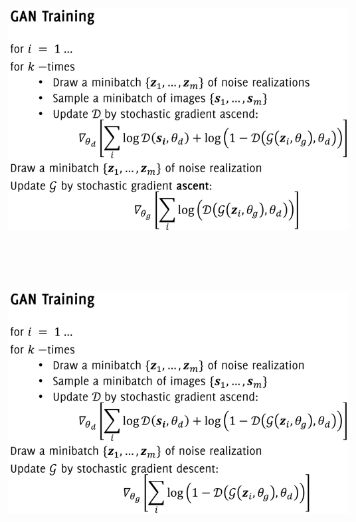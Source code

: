 \begin{minipage}{\linewidth}
\centering
\hspace*{-2cm}    
\begin{minipage}{9cm}
  \includegraphics[width=9cm, height=7cm]{images/gan_sgd.png}
\end{minipage}%
\begin{minipage}{10cm}
  \centering
  \includegraphics[width=9cm, height=7cm]{images/gan_sga.png}
\end{minipage}
\end{minipage}\\ \\

